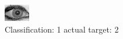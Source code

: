 \begin{figure}[h!]
\begin{center}
\includegraphics[width=0.60\columnwidth]{figures/ID2022_class_1_target_2.png}
\end{center}
\caption{ Classification: 1 actual target: 2}
\label{fig:ID2022_class_1_target_2}
\end{figure}
